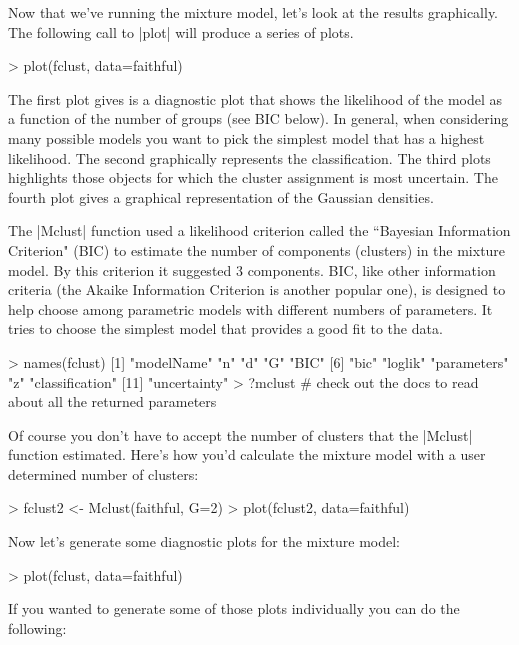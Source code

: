Now that we've running the mixture model, let's look at the results graphically. The following call to |plot| will produce a series of plots.

\begin{Code}
> plot(fclust, data=faithful)    
\end{Code}

The first plot gives is a diagnostic plot that shows the likelihood of the model as a function of  the number of groups (see BIC below). In general, when considering many possible models you want to pick the simplest model that has a highest likelihood. The second graphically represents the classification. The third plots highlights those objects for which the cluster assignment is most uncertain. The fourth plot gives a graphical representation of the Gaussian densities.

The |Mclust| function used a likelihood criterion called the ``Bayesian Information Criterion" (BIC) to estimate the number of components (clusters) in the mixture model. By this criterion it suggested 3 components. BIC, like other information criteria (the Akaike Information Criterion is another popular one), is designed to help choose among parametric models with different numbers of parameters. It tries to choose the simplest model that provides a good fit to the data.

\begin{Code}
> names(fclust)
 [1] "modelName"      "n"              "d"              "G"              "BIC"           
 [6] "bic"            "loglik"         "parameters"     "z"              "classification"
[11] "uncertainty"
> ?mclust  # check out the docs to read about all the returned parameters
\end{Code}

Of course you don't have to accept the number of clusters that the |Mclust| function estimated. Here's how you'd calculate the mixture model with a user determined number of clusters:

\begin{Code}
> fclust2 <- Mclust(faithful, G=2)
> plot(fclust2, data=faithful)    
\end{Code}

Now let's generate some diagnostic plots for the mixture model:

\begin{Code}
> plot(fclust, data=faithful)    
\end{Code}

If you wanted to generate some of those plots individually you can do the following:

